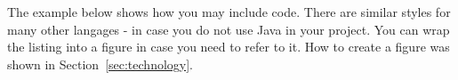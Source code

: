 The example below shows how you may include code. There are similar
styles for many other langages - in case you do not use Java in your
project. You can wrap the listing into a figure in case you need to
refer to it. How to create a figure was shown in Section~\ref{sec:technology}.

